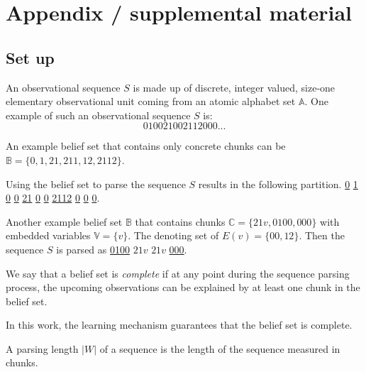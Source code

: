 \documentclass{article} %
\theoremstyle{remark}
\begin{document}






\appendix
\section{Appendix / supplemental material}
\subsection{Set up}
An observational sequence $S$ is made up of discrete, integer valued, size-one elementary observational unit coming from an atomic alphabet set $\mathbb{A}$.  One example of such an observational sequence $S$ is: $$ 010021002112000... $$

An example belief set that contains only concrete chunks can be $\mathbb{B} = \{0,1,21,211,12,2112\}$. 

Using the belief set to parse the sequence $S$ results in the following partition. \underline{0} \underline{1} \underline{0} \underline{0} \underline{21} \underline{0} \underline{0} \underline{2112} \underline{0} \underline{0} \underline{0}.

Another example belief set $\mathbb{B}$ that contains chunks $\mathbb{C} = \{21v,0100,000\}$ with embedded variables $\mathbb{V} = \{v\}$. The denoting set of $E(v) = \{00, 12\}$. Then the sequence $S$ is parsed as  \underline{0100} \underline{$21v$} \underline{$21v$} \underline{000}.

\begin{definition}[Completeness]
We say that a belief set is \emph{complete} if at any point during the sequence parsing process, the upcoming observations can be explained by at least one chunk in the belief set. 
\end{definition}
In this work, the learning mechanism guarantees that the belief set is complete. 

\begin{definition}
A parsing length $|W|$ of a sequence is the length of the sequence measured in chunks. 
\end{definition}
\end{document}
